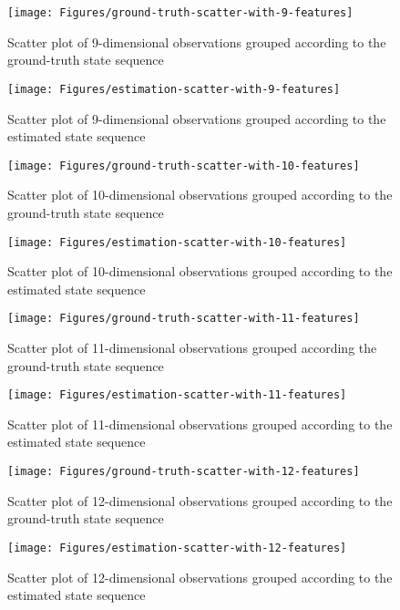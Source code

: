 \begin{figure}[ht!]
	\texttt{[image: Figures/ground-truth-scatter-with-9-features]}
	\caption{Scatter plot of 9-dimensional observations grouped according to the ground-truth state sequence}
	\label{fig:gt-9dim}
\end{figure}

\begin{figure}[ht!]
	\texttt{[image: Figures/estimation-scatter-with-9-features]}
	\caption{Scatter plot of 9-dimensional observations grouped according to the estimated state sequence}
	\label{fig:es-9dim}
\end{figure}
	
	\begin{figure}[ht!]
		\texttt{[image: Figures/ground-truth-scatter-with-10-features]}
		\caption{Scatter plot of 10-dimensional observations grouped according to the ground-truth state sequence}
		\label{fig:gt-10dim}
	\end{figure}
	
	\begin{figure}[ht!]
		\texttt{[image: Figures/estimation-scatter-with-10-features]}
		\caption{Scatter plot of 10-dimensional observations grouped according to the estimated state sequence}
		\label{fig:es-10dim}
	\end{figure}
	
	\begin{figure}[ht!]
		\texttt{[image: Figures/ground-truth-scatter-with-11-features]}
		\caption{Scatter plot of  11-dimensional observations grouped according the ground-truth state sequence}
		\label{fig:gt-11dim}
	\end{figure}
	\begin{figure}[ht!]
		\texttt{[image: Figures/estimation-scatter-with-11-features]}
		\caption{Scatter plot of 11-dimensional observations grouped according to the estimated state sequence}
		\label{fig:es-11dim}
	\end{figure}
	
	\begin{figure}[ht!]
		\texttt{[image: Figures/ground-truth-scatter-with-12-features]}
		\caption{Scatter plot of 12-dimensional observations grouped according to the ground-truth state sequence}
		\label{fig:gt-12dim}
	\end{figure}
	
	\begin{figure}[ht!]
		\texttt{[image: Figures/estimation-scatter-with-12-features]}
		\caption{Scatter plot of 12-dimensional observations grouped according to the estimated state sequence}
		\label{fig:es-12dim}
	\end{figure}
	
